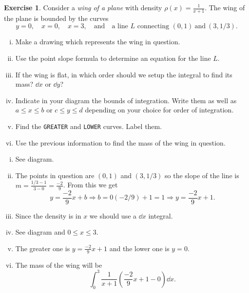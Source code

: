 \documentclass[12pt]{article}
\theoremstyle{plain}
\theoremstyle{definition}
\newtheorem{Ej}[Th]{Exercise}         %
\theoremstyle{remark}
\renewcommand{\leq}{\leqslant}      %
\renewcommand{\:}{\colon}           %
\renewcommand{\.}{\Cdot}                %
\newcommand{\To}{\Rightarrow}
\begin{document}

\begin{Ej}
  Consider a \emph{wing of a plane} with density $\rho(x)=\frac{1}{x+1}$. The wing of the plane is bounded by the curves
  $$y=0,\quad x=0,\quad x=3,\quad\text{and}\quad\text{a line }L\text{ connecting } (0,1)\ \text{and}\ (3,1/3).$$
  \begin{enumerate}[i)]
    \itemsep=-0.4em 
    \item Make a drawing which represents the wing in question.
    \item Use the point slope formula to determine an equation for the line $L$. 
    \item If the wing is flat, in which order should we setup the integral to find its mass? $\dd x$ or $\dd y$?
    \item Indicate in your diagram the bounds of integration. Write them as well as $a\leq x\leq b$ or $c\leq y\leq d$ depending on your choice for order of integration.
    \item Find the \texttt{GREATER} and \texttt{LOWER} curves. Label them.
    \item Use the previous information to find the mass of the wing in question.
  \end{enumerate}
\end{Ej}
\begin{ptcb}
  \begin{enumerate}[i)]
    \itemsep=-0.4em 
    \item See diagram.
    \item The points in question are $(0,1)$ and $(3,1/3)$ so the slope of the line is $m=\frac{1/3-1}{3-0}=\frac{-2}{9}$. From this we get 
    $$y=\frac{-2}{9}x+b\To b=0(-2/9)+1=1\To y=\frac{-2}{9}x+1.$$
    \item Since the density is in $x$ we should use a $\dd x$ integral.
    \item See diagram and $0\leq x \leq 3$.
    \item The greater one is $y=\frac{-2}{9}x+1$ and the lower one is $y=0$.
    \item The mass of the wing will be 
    $$\int_0^3\frac{1}{x+1}\left(\frac{-2}{9}x+1-0\right)\dd x.$$
  \end{enumerate}
\end{ptcb}
\end{document}

